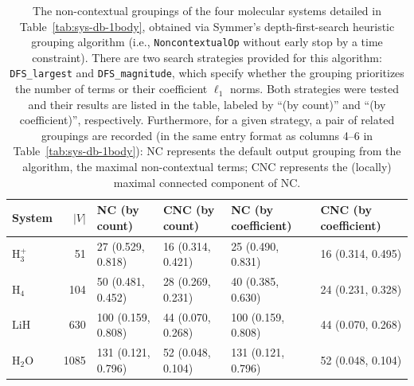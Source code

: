 \documentclass[%
 aip,
 amsmath,amssymb,
 reprint,%
]{revtex4-1}
\begin{document}
\begin{table}[htbp]
\centering
\renewcommand{\arraystretch}{1.1}
\setlength{\tabcolsep}{4pt}
\begin{tabular}{l r *{4}{w{r}{85pt}}}
\toprule
System & $|V|$ & NC (by count) & CNC (by count) & NC (by coefficient) & CNC (by coefficient) \\
\midrule
$\mathrm{H_3^{+}}$ &   51 &  27 (0.529, 0.818) & 16 (0.314, 0.421) &  25 (0.490, 0.831) & 16 (0.314, 0.495) \\
$\mathrm{H_4}$     &  104 &  50 (0.481, 0.452) & 28 (0.269, 0.231) &  40 (0.385, 0.630) & 24 (0.231, 0.328) \\
$\mathrm{LiH}$     &  630 & 100 (0.159, 0.808) & 44 (0.070, 0.268) & 100 (0.159, 0.808) & 44 (0.070, 0.268) \\
$\mathrm{H_2O}$    & 1085 & 131 (0.121, 0.796) & 52 (0.048, 0.104) & 131 (0.121, 0.796) & 52 (0.048, 0.104) \\
\bottomrule
\end{tabular}
\caption{The non-contextual groupings of the four
molecular systems detailed in Table~\ref{tab:sys-db-1body}, obtained via Symmer's depth-first-search heuristic grouping algorithm (i.e., \texttt{NoncontextualOp} without early stop by a time constraint). There are two search strategies provided for this algorithm:
\texttt{DFS\_largest} and \texttt{DFS\_magnitude}, which specify whether the grouping prioritizes the number of terms or their coefficient $\ell_1$ norms. Both strategies were tested and their results are listed in the table, labeled by ``(by count)'' and ``(by coefficient)'', respectively. Furthermore, for a given strategy, a pair of related groupings are recorded (in the same entry format as columns 4--6 in Table~\ref{tab:sys-db-1body}): NC represents the default output grouping from the algorithm, the maximal non-contextual terms; CNC represents the (locally) maximal connected component of NC.}
\label{tab:symmer-noncontextual}
\end{table}
\end{document}
